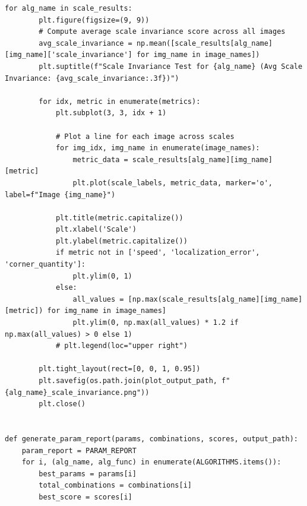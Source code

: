 \documentclass[journal]{IEEEtran}
\begin{document}
\begin{lstlisting}[style=python, caption={Utility Functions for Data Processing}, label={lst:utilities}]
    for alg_name in scale_results:
        plt.figure(figsize=(9, 9))
        # Compute average scale invariance score across all images
        avg_scale_invariance = np.mean([scale_results[alg_name][img_name]['scale_invariance'] for img_name in image_names])
        plt.suptitle(f"Scale Invariance Test for {alg_name} (Avg Scale Invariance: {avg_scale_invariance:.3f})")
        
        for idx, metric in enumerate(metrics):
            plt.subplot(3, 3, idx + 1)
            
            # Plot a line for each image across scales
            for img_idx, img_name in enumerate(image_names):
                metric_data = scale_results[alg_name][img_name][metric]
                plt.plot(scale_labels, metric_data, marker='o', label=f"Image {img_name}")
            
            plt.title(metric.capitalize())
            plt.xlabel('Scale')
            plt.ylabel(metric.capitalize())
            if metric not in ['speed', 'localization_error', 'corner_quantity']:
                plt.ylim(0, 1)
            else:
                all_values = [np.max(scale_results[alg_name][img_name][metric]) for img_name in image_names]
                plt.ylim(0, np.max(all_values) * 1.2 if np.max(all_values) > 0 else 1)
            # plt.legend(loc="upper right")
        
        plt.tight_layout(rect=[0, 0, 1, 0.95])
        plt.savefig(os.path.join(plot_output_path, f"{alg_name}_scale_invariance.png"))
        plt.close() 
        

def generate_param_report(params, combinations, scores, output_path):
    param_report = PARAM_REPORT
    for i, (alg_name, alg_func) in enumerate(ALGORITHMS.items()):
        best_params = params[i]
        total_combinations = combinations[i]
        best_score = scores[i]
        

\end{lstlisting}
\end{document}
